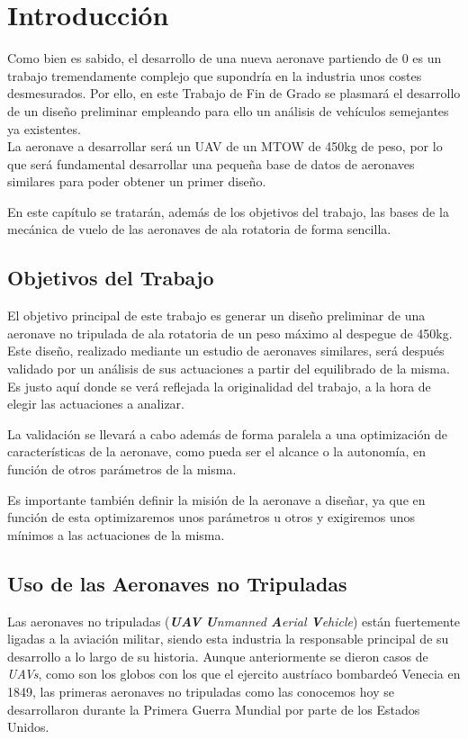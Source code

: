 \thispagestyle{empty}
\chapter{Introducción}

Como bien es sabido, el desarrollo de una nueva aeronave partiendo de 0 es un trabajo tremendamente complejo que supondría en la industria unos costes desmesurados. Por ello, en este Trabajo de Fin de Grado se plasmará el desarrollo de un diseño preliminar empleando para ello un análisis de vehículos semejantes ya existentes.\\


La aeronave a desarrollar será un UAV de un MTOW de 450kg de peso, por lo que será fundamental desarrollar una pequeña base de datos de aeronaves similares para poder obtener un primer diseño.

En este capítulo se tratarán, además de los objetivos del trabajo, las bases de la mecánica de vuelo de las aeronaves de ala rotatoria de forma sencilla.

\section{Objetivos del Trabajo}

El objetivo principal de este trabajo es generar un diseño preliminar de una aeronave no tripulada de ala rotatoria de un peso máximo al despegue de 450kg. Este diseño, realizado mediante un estudio de aeronaves similares, será después validado por un análisis de sus actuaciones a partir del equilibrado de la misma.
Es justo aquí donde se verá reflejada la originalidad del trabajo, a la hora de elegir las actuaciones a analizar.

La validación se llevará a cabo además de forma paralela a una optimización de características de la aeronave, como pueda ser el alcance o la autonomía, en función de otros parámetros de la misma.

Es importante también definir la misión de la aeronave a diseñar, ya que en función de esta optimizaremos unos parámetros u otros y exigiremos unos mínimos a las actuaciones de la misma.

\section{Uso de las Aeronaves no Tripuladas}
Las aeronaves no tripuladas (\emph{\textbf{UAV} \textbf{U}nmanned \textbf{A}erial \textbf{V}ehicle}) están fuertemente ligadas a la aviación militar, siendo esta industria la responsable principal de su desarrollo a lo largo de su historia.
Aunque anteriormente se dieron casos de \emph{UAVs}, como son los globos con los que el ejercito austríaco bombardeó Venecia en 1849, las primeras aeronaves no tripuladas como las conocemos hoy se desarrollaron durante la Primera Guerra Mundial por parte de los Estados Unidos. 


